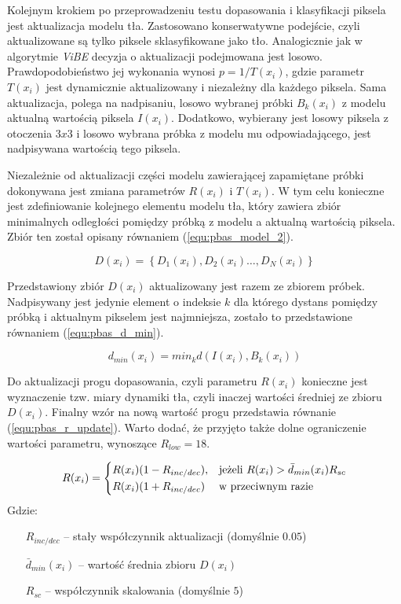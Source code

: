 \documentclass[b5paper,10pt,twoside]{article}
\begin{document}
{Kolejnym krokiem po przeprowadzeniu testu dopasowania i klasyfikacji piksela jest aktualizacja modelu tła. Zastosowano konserwatywne podejście, czyli aktualizowane są tylko piksele sklasyfikowane jako tło. Analogicznie jak w algorytmie \textit{ViBE} decyzja o aktualizacji podejmowana jest losowo. Prawdopodobieństwo jej wykonania wynosi $p = 1/T(x_i)$, gdzie parametr $T(x_i)$ jest dynamicznie aktualizowany i niezależny dla każdego piksela. Sama aktualizacja, polega na nadpisaniu, losowo wybranej próbki $B_k(x_i)$ z modelu aktualną wartością piksela $I(x_i)$. Dodatkowo, wybierany jest losowy piksela z otoczenia $3x3$ i losowo wybrana próbka z modelu mu odpowiadającego, jest nadpisywana wartością tego piksela.

Niezależnie od aktualizacji części modelu zawierającej zapamiętane próbki dokonywana jest zmiana parametrów $R(x_i)$ i $T(x_i)$. W tym celu konieczne jest zdefiniowanie kolejnego elementu modelu tła, który zawiera zbiór minimalnych odległości pomiędzy próbką z modelu a aktualną wartością piksela. Zbiór ten został opisany równaniem (\ref{equ:pbas_model_2}). 
 
	\begin{equation}
		D(x_i)= \left\{ D_1(x_i), D_2(x_i) \dotsc, D_N(x_i) \right\}
	\label{equ:pbas_model_2}	
	\end{equation}

Przedstawiony zbiór $D(x_i)$ aktualizowany jest razem ze zbiorem próbek. Nadpisywany jest jedynie element o indeksie $k$ dla którego dystans pomiędzy próbką i aktualnym pikselem jest najmniejsza, zostało to przedstawione równaniem (\ref{equ:pbas_d_min}).
	
	\begin{equation}
		d_{min}(x_i) = min_k d(I(x_i), B_k(x_i))
	\label{equ:pbas_d_min}	
	\end{equation}

Do aktualizacji progu dopasowania, czyli parametru $R(x_i)$ konieczne jest wyznaczenie tzw. miary dynamiki tła, czyli inaczej wartości średniej ze zbioru $D(x_i)$. Finalny wzór na nową wartość progu przedstawia równanie (\ref{equ:pbas_r_update}). Warto dodać, że przyjęto także dolne ograniczenie wartości parametru, wynoszące $R_{low} = 18$.
    
    \begin{equation}
	    R(x_i) = 
		\begin{dcases}
    		R(x_i)(1-R_{inc/dec}), & \text{jeżeli } R(x_i) > \bar{d}_{min}(x_i)R_{sc} \\
    		R(x_i)(1+R_{inc/dec}) & \text{w przeciwnym razie} 
		\end{dcases}
	\label{equ:pbas_r_update}	
	\end{equation}
Gdzie:
\begin{itemize}
	\item[$R_{inc/dec}$] -- stały współczynnik aktualizacji (domyślnie $0.05$)
	\item[$\bar{d}_{min}(x_i)$] -- wartość średnia zbioru $D(x_i)$
	\item[$R_{sc}$] -- współczynnik skalowania (domyślnie $5$)
\end{itemize}

}
\end{document}
